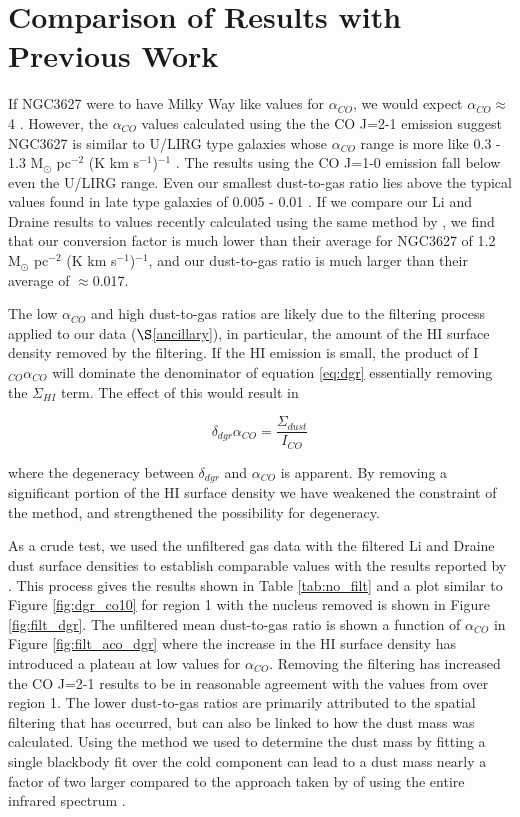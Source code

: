 \section{Comparison of Results with Previous Work}

If NGC3627 were to have Milky Way like values for $\alpha_{CO}$, we would expect $\alpha_{CO}\approx$4 \citep{sandstrom2013}.  However, the $\alpha_{CO}$ values calculated using the the CO J=2-1 emission suggest NGC3627 is similar to U/LIRG type galaxies whose $\alpha_{CO}$ range is more like 0.3 - 1.3 M$_\odot$ pc$^{-2}$ (K km s$^{-1}$)$^{-1}$ \citep{downes1998}.  The results using the CO J=1-0 emission fall below even the U/LIRG range.  Even our smallest dust-to-gas ratio lies above the typical values found in late type galaxies of 0.005 - 0.01 \citep{smith2012}.  If we compare our Li and Draine results to values recently calculated using the same method by \cite{sandstrom2013}, we find that our conversion factor is much lower than their average for NGC3627 of 1.2 M$_\odot$ pc$^{-2}$ (K km s$^{-1}$)$^{-1}$, and our dust-to-gas ratio is much larger than their average of $\approx$0.017.  

The low $\alpha_{CO}$ and high dust-to-gas ratios are likely due to the filtering process applied to our data ($\S$\ref{ancillary}), in particular, the amount of the HI surface density removed by the filtering.  If the HI emission is small, the product of I$_{CO}\alpha_{CO}$ will dominate the denominator of equation \ref{eq:dgr} essentially removing the $\Sigma_{HI}$ term.  The effect of this would result in 

\begin{equation}\label{dgr:degen}
  \delta_{dgr}\alpha_{CO} = \frac{\Sigma_{dust}}{I_{CO}}
\end{equation}

\noindent where the degeneracy between $\delta_{dgr}$ and $\alpha_{CO}$ is apparent.  By removing a significant portion of the HI surface density we have weakened the constraint of the method, and strengthened the possibility for degeneracy.

As a crude test, we used the unfiltered gas data with the filtered Li and Draine dust surface densities to establish comparable values with the results reported by \cite{sandstrom2013}.  This process gives the results shown in Table \ref{tab:no_filt} and a plot similar to Figure \ref{fig:dgr_co10} for region 1 with the nucleus removed is shown in Figure \ref{fig:filt_dgr}.  The unfiltered mean dust-to-gas ratio is shown a function of $\alpha_{CO}$ in Figure \ref{fig:filt_aco_dgr} where the increase in the HI surface density has introduced a plateau at low values for $\alpha_{CO}$.  Removing the filtering has increased the CO J=2-1 results to be in reasonable agreement with the values from \cite{sandstrom2013} over region 1.  The lower dust-to-gas ratios are primarily attributed to the spatial filtering that has occurred, but can also be linked to how the dust mass was calculated.  Using the method we used to determine the dust mass by fitting a single blackbody fit over the cold component can lead to a dust mass nearly a factor of two larger compared to the approach taken by \cite{sandstrom2013} of using the entire infrared spectrum \citep{dale2012}.

